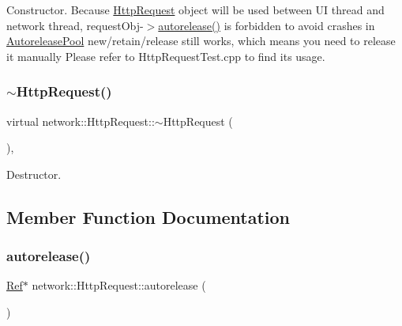 Constructor. Because \hyperlink{classnetwork_1_1HttpRequest}{Http\+Request} object will be used between UI thread and network thread, request\+Obj-\/$>$\hyperlink{classnetwork_1_1HttpRequest_a0fc06041ec6a34d4f92c786a99a91a33}{autorelease()} is forbidden to avoid crashes in \hyperlink{classAutoreleasePool}{Autorelease\+Pool} new/retain/release still works, which means you need to release it manually Please refer to Http\+Request\+Test.\+cpp to find its usage. \mbox{\label{classnetwork_1_1HttpRequest_aeb9ba7fdc3fef6237d611fc9af752bad}} 
\subsubsection{\texorpdfstring{$\sim$\+Http\+Request()}{~HttpRequest()}\hspace{0.1cm}{\footnotesize\ttfamily [2/2]}}
{\footnotesize\ttfamily virtual network\+::\+Http\+Request\+::$\sim$\+Http\+Request (\begin{DoxyParamCaption}{ }\end{DoxyParamCaption})\hspace{0.3cm}{\ttfamily [inline]}, {\ttfamily [virtual]}}

Destructor. 

\subsection{Member Function Documentation}
\mbox{\label{classnetwork_1_1HttpRequest_a0fc06041ec6a34d4f92c786a99a91a33}} 
\subsubsection{\texorpdfstring{autorelease()}{autorelease()}\hspace{0.1cm}{\footnotesize\ttfamily [1/2]}}
{\footnotesize\ttfamily \hyperlink{classRef}{Ref}$\ast$ network\+::\+Http\+Request\+::autorelease (\begin{DoxyParamCaption}{ }\end{DoxyParamCaption})\hspace{0.3cm}{\ttfamily [inline]}}

